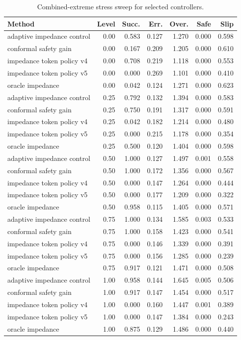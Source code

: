 \begin{table}[p]
\centering
\caption{Combined-extreme stress sweep for selected controllers.}
\label{tab:stress}
\scriptsize
\begin{tabular}{lrrrrrr}
\toprule
Method & Level & Succ. & Err. & Over. & Safe & Slip \\
\midrule
adaptive impedance control & 0.00 & 0.583 & 0.127 & 1.270 & 0.000 & 0.598 \\
conformal safety gain & 0.00 & 0.167 & 0.209 & 1.205 & 0.000 & 0.610 \\
impedance token policy v4 & 0.00 & 0.708 & 0.219 & 1.118 & 0.000 & 0.553 \\
impedance token policy v5 & 0.00 & 0.000 & 0.269 & 1.101 & 0.000 & 0.410 \\
oracle impedance & 0.00 & 0.042 & 0.124 & 1.271 & 0.000 & 0.623 \\
adaptive impedance control & 0.25 & 0.792 & 0.132 & 1.394 & 0.000 & 0.583 \\
conformal safety gain & 0.25 & 0.750 & 0.191 & 1.317 & 0.000 & 0.591 \\
impedance token policy v4 & 0.25 & 0.042 & 0.182 & 1.214 & 0.000 & 0.480 \\
impedance token policy v5 & 0.25 & 0.000 & 0.215 & 1.178 & 0.000 & 0.354 \\
oracle impedance & 0.25 & 0.500 & 0.120 & 1.404 & 0.000 & 0.598 \\
adaptive impedance control & 0.50 & 1.000 & 0.127 & 1.497 & 0.001 & 0.558 \\
conformal safety gain & 0.50 & 1.000 & 0.172 & 1.356 & 0.000 & 0.567 \\
impedance token policy v4 & 0.50 & 0.000 & 0.147 & 1.264 & 0.000 & 0.444 \\
impedance token policy v5 & 0.50 & 0.000 & 0.177 & 1.209 & 0.000 & 0.322 \\
oracle impedance & 0.50 & 0.958 & 0.115 & 1.405 & 0.000 & 0.571 \\
adaptive impedance control & 0.75 & 1.000 & 0.134 & 1.585 & 0.003 & 0.533 \\
conformal safety gain & 0.75 & 1.000 & 0.158 & 1.423 & 0.000 & 0.541 \\
impedance token policy v4 & 0.75 & 0.000 & 0.146 & 1.339 & 0.000 & 0.391 \\
impedance token policy v5 & 0.75 & 0.000 & 0.156 & 1.285 & 0.000 & 0.239 \\
oracle impedance & 0.75 & 0.917 & 0.121 & 1.471 & 0.000 & 0.508 \\
adaptive impedance control & 1.00 & 0.958 & 0.144 & 1.645 & 0.005 & 0.506 \\
conformal safety gain & 1.00 & 0.917 & 0.147 & 1.454 & 0.000 & 0.517 \\
impedance token policy v4 & 1.00 & 0.000 & 0.160 & 1.447 & 0.001 & 0.389 \\
impedance token policy v5 & 1.00 & 0.000 & 0.147 & 1.384 & 0.000 & 0.243 \\
oracle impedance & 1.00 & 0.875 & 0.129 & 1.486 & 0.000 & 0.440 \\
\bottomrule
\end{tabular}
\end{table}
